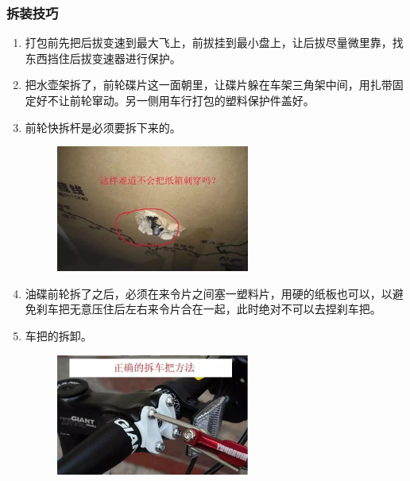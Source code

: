 \documentclass{ctexbook}
\begin{document}
\subsubsection{拆装技巧}
\begin{enumerate}
    \item 打包前先把后拔变速到最大飞上，前拔挂到最小盘上，让后拔尽量微里靠，找东西挡住后拔变速器进行保护。
    \item 把水壶架拆了，前轮碟片这一面朝里，让碟片躲在车架三角架中间，用扎带固定好不让前轮窜动。另一侧用车行打包的塑料保护件盖好。
    \item 前轮快拆杆是必须要拆下来的。
       \begin{figure}[H]
            \begin{center}
            \includegraphics[width=0.6\textwidth]{fig/快拆杆}
            \end{center}
        \end{figure}
    \item 油碟前轮拆了之后，必须在来令片之间塞一塑料片，用硬的纸板也可以，以避免刹车把无意压住后左右来令片合在一起，此时绝对不可以去捏刹车把。
    \item 车把的拆卸。
       \begin{figure}[H]
            \begin{center}
            \includegraphics[width=0.6\textwidth]{fig/拆车把1}
            \end{center}
        \end{figure}

\end{enumerate}
\end{document}

